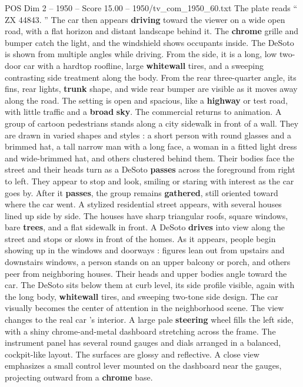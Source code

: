 \begin{textsample}{POS Dim 2 – 1950 – Score 15.00 – 1950/tv\_com\_1950\_60.txt}
The plate reads “ ZX 44843. ” The car then appears \textbf{driving} toward the viewer on a wide open road, with a flat horizon and distant landscape behind it.
The \textbf{chrome} grille and bumper catch the light, and the windshield shows occupants inside.
The DeSoto is shown from multiple angles while driving.
From the side, it is a long, low two-door car with a hardtop roofline, large \textbf{whitewall} tires, and a sweeping contrasting side treatment along the body.
From the rear three-quarter angle, its fins, rear lights, \textbf{trunk} shape, and wide rear bumper are visible as it moves away along the road.
The setting is open and spacious, like a \textbf{highway} or test road, with little traffic and a \textbf{broad} \textbf{sky}.
The commercial returns to animation.
A group of cartoon pedestrians stands along a city sidewalk in front of a wall.
They are drawn in varied shapes and styles : a short person with round glasses and a brimmed hat, a tall narrow man with a long face, a woman in a fitted light dress and wide-brimmed hat, and others clustered behind them.
Their bodies face the street and their heads turn as a DeSoto \textbf{passes} across the foreground from right to left.
They appear to stop and look, smiling or staring with interest as the car goes by.
After it \textbf{passes}, the group remains \textbf{gathered}, still oriented toward where the car went.
A stylized residential street appears, with several houses lined up side by side.
The houses have sharp triangular roofs, square windows, bare \textbf{trees}, and a flat sidewalk in front.
A DeSoto \textbf{drives} into view along the street and stops or slows in front of the homes.
As it appears, people begin showing up in the windows and doorways : figures lean out from upstairs and downstairs windows, a person stands on an upper balcony or porch, and others peer from neighboring houses.
Their heads and upper bodies angle toward the car.
The DeSoto sits below them at curb level, its side profile visible, again with the long body, \textbf{whitewall} tires, and sweeping two-tone side design.
The car visually becomes the center of attention in the neighborhood scene.
The view changes to the real car ’s interior.
A large pale \textbf{steering} wheel fills the left side, with a shiny chrome-and-metal dashboard stretching across the frame.
The instrument panel has several round gauges and dials arranged in a balanced, cockpit-like layout.
The surfaces are glossy and reflective.
A close view emphasizes a small control lever mounted on the dashboard near the gauges, projecting outward from a \textbf{chrome} base.

\end{textsample}
